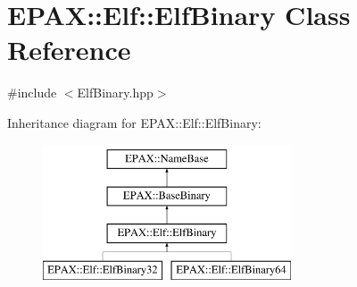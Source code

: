 \hypertarget{class_e_p_a_x_1_1_elf_1_1_elf_binary}{\section{\-E\-P\-A\-X\-:\-:\-Elf\-:\-:\-Elf\-Binary \-Class \-Reference}
\label{class_e_p_a_x_1_1_elf_1_1_elf_binary}
}


{\ttfamily \#include $<$\-Elf\-Binary.\-hpp$>$}

\-Inheritance diagram for \-E\-P\-A\-X\-:\-:\-Elf\-:\-:\-Elf\-Binary\-:\begin{figure}[H]
\begin{center}
\leavevmode
\includegraphics[height=4.000000cm]{class_e_p_a_x_1_1_elf_1_1_elf_binary}
\end{center}
\end{figure}
